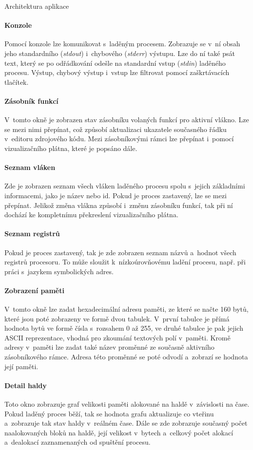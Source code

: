 \documentclass[czech,bachelor,male,python,dept460,hidelinks]{diploma}						%
\begin{document}
\begin{section}{Architektura aplikace}
	\paragraph*{Konzole} Pomocí konzole lze komunikovat s~laděným procesem. Zobrazuje se v~ní obsah jeho standardního (\textit{stdout}) i~chybového (\textit{stderr})
		výstupu. Lze do ní také psát text, který se po odřádkování odešle na standardní vstup (\textit{stdin}) laděného procesu.
		Výstup, chybový výstup i~vstup lze filtrovat pomocí zaškrtávacích tlačítek.
	\paragraph*{Zásobník funkcí} V~tomto okně je zobrazen stav zásobníku volaných funkcí pro aktivní vlákno. Lze se mezi nimi přepínat, což způsobí aktualizaci
		ukazatele současného řádku v~editoru zdrojového kódu. Mezi zásobníkovými rámci lze přepínat i~pomocí vizualizačního plátna, které je popsáno dále.
	\paragraph*{Seznam vláken} Zde je zobrazen seznam všech vláken laděného procesu spolu s~jejich základními informacemi, jako je název nebo id. Pokud je proces
		zastavený, lze se mezi přepínat. Jelikož změna vlákna způsobí i~změnu zásobníku funkcí, tak při ní dochází ke kompletnímu překreslení vizualizačního
		plátna.
	\paragraph*{Seznam registrů}
		Pokud je proces zastavený, tak je zde zobrazen seznam názvů a~hodnot všech registrů procesoru. To může sloužit k~nízkoúrovňovému ladění procesu, např.
		při práci s~jazykem symbolických adres.
	\paragraph*{Zobrazení paměti} V~tomto okně lze zadat hexadecimální adresu paměti, ze které se načte 160 bytů, které jsou poté zobrazeny ve formě dvou tabulek.
		V~první tabulce je přímá hodnota bytů ve formě čísla s~rozsahem 0 až 255, ve druhé tabulce je pak jejich ASCII reprezentace, vhodná pro zkoumání textových
		polí v~paměti. Kromě adresy v~paměti lze zadat také název proměnné ze současně aktivního zásobníkového rámce. Adresa této proměnné se poté odvodí
		a~zobrazí se hodnota její paměti.
	\paragraph*{Detail haldy}
		Toto okno zobrazuje graf velikosti paměti alokované na haldě v~závislosti na čase. Pokud laděný proces běží, tak se hodnota grafu aktualizuje co vteřinu
		a~zobrazuje tak stav haldy v~reálném čase. Dále se zde zobrazuje současný počet naalokovaných bloků na haldě, její velikost v~bytech a~celkový počet
		alokací a~dealokací zaznamenaných od spuštění procesu.

\end{section}
\end{document}
